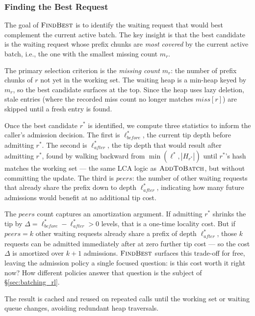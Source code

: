 \subsubsection*{Finding the Best Request}

The goal of $\textsc{FindBest}$ is to identify the waiting request that would best complement the current active batch. The key insight is that the best candidate is the waiting request whose prefix chunks are \emph{most covered} by the current active batch, i.e., the one with the smallest missing count $m_r$.

The primary selection criterion is the \emph{missing count} $m_r$: the number of prefix chunks of $r$ not yet in the working set. The waiting heap is a min-heap keyed by $m_r$, so the best candidate surfaces at the top. Since the heap uses lazy deletion, stale entries (where the recorded miss count no longer matches $\mathit{miss}[r]$) are skipped until a fresh entry is found.

Once the best candidate $r^*$ is identified, we compute three statistics to inform the caller's admission decision. The first is $\ell^*_{\mathit{before}}$, the current tip depth before admitting $r^*$. The second is $\ell^*_{\mathit{after}}$, the tip depth that would result after admitting $r^*$, found by walking backward from $\min(\ell^*, |H_{r^*}|)$ until $r^*$'s hash matches the working set — the same LCA logic as $\textsc{AddToBatch}$, but without committing the update. The third is $\mathit{peers}$: the number of other waiting requests that already share the prefix down to depth $\ell^*_{\mathit{after}}$, indicating how many future admissions would benefit at no additional tip cost.

The $\mathit{peers}$ count captures an amortization argument. If admitting $r^*$ shrinks the tip by $\Delta = \ell^*_{\mathit{before}} - \ell^*_{\mathit{after}} > 0$ levels, that is a one-time locality cost. But if $\mathit{peers} = k$ other waiting requests already share a prefix of depth $\ell^*_{\mathit{after}}$, those $k$ requests can be admitted immediately after at zero further tip cost — so the cost $\Delta$ is amortized over $k + 1$ admissions. $\textsc{FindBest}$ surfaces this trade-off for free, leaving the admission policy a single focused question: is this cost worth it right now? How different policies answer that question is the subject of \S\ref{sec:batching_rl}.

The result is cached and reused on repeated calls until the working set or waiting queue changes, avoiding redundant heap traversals.


